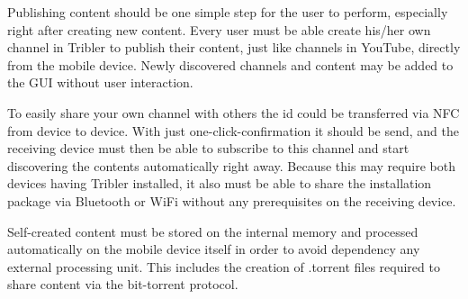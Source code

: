 Publishing content should be one simple step for the user to perform, especially right after creating new content.
Every user must be able create his/her own channel in Tribler to publish their content, just like channels in YouTube, directly from the mobile device.
Newly discovered channels and content may be added to the GUI without user interaction.

To easily share your own channel with others the id could be transferred via NFC from device to device.
With just one-click-confirmation it should be send, and the receiving device must then be able to subscribe to this channel and start discovering the contents automatically right away.
Because this may require both devices having Tribler installed, it also must be able to share the installation package via Bluetooth or WiFi without any prerequisites on the receiving device.

Self-created content must be stored on the internal memory and processed automatically on the mobile device itself in order to avoid dependency any external processing unit.
This includes the creation of .torrent files required to share content via the bit-torrent protocol.

